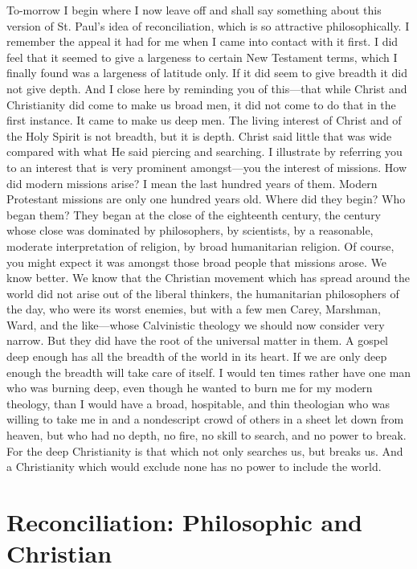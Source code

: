 \documentclass[12pt,a5paper,twoside,titlepage]{book}
\begin{document}
To-morrow I begin where I now leave off 
and shall say something about this version of 
St. Paul's idea of reconciliation, which is so 
attractive philosophically. I remember the 
appeal it had for me when I came into contact 
with it first. I did feel that it seemed to give 
a largeness to certain New Testament terms, 
which I finally found was a largeness of latitude 
only. If it did seem to give breadth it 
did not give depth. And I close here by reminding 
you of this---that while Christ and 
Christianity did come to make us broad men, 
it did not come to do that in the first instance. 
It came to make us deep men. The living 
interest of Christ and of the Holy Spirit is not 
breadth, but it is depth. Christ said little 
that was wide compared with what He said 
piercing and searching. I illustrate by referring 
you to an interest that is very prominent 
amongst---you the interest of missions. How 
did modern missions arise? I mean the last 
hundred years of them. Modern Protestant 
missions are only one hundred years old. 
Where did they begin? Who began them? 
They began at the close of the eighteenth 
century, the century whose close was dominated 
by philosophers, by scientists, by a 
reasonable, moderate interpretation of religion, 
by broad humanitarian religion. Of course, 
you might expect it was amongst those broad 
people that missions arose. We know better. 
We know that the Christian movement which 
has spread around the world did not arise out 
of the liberal thinkers, the humanitarian philosophers 
of the day, who were its worst enemies, 
but with a few men Carey, Marshman, Ward,
and the like---whose Calvinistic theology we 
should now consider very narrow. But they did 
have the root of the universal matter in them. 
A gospel deep enough has all the breadth of the 
world in its heart. If we are only deep enough 
the breadth will take care of itself. I would 
ten times rather have one man who was burning 
deep, even though he wanted to burn me 
for my modern theology, than I would have a 
broad, hospitable, and thin theologian who was 
willing to take me in and a nondescript crowd 
of others in a sheet let down from heaven, 
but who had no depth, no fire, no skill to 
search, and no power to break. For the deep 
Christianity is that which not only searches 
us, but breaks us. And a Christianity which 
would exclude none has no power to include 
the world. 


\chapter{Reconciliation: Philosophic and Christian}
\end{document}
